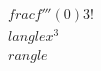 \documentclass[preview]{standalone}
\begin{document}
\begin{align*}
\quad\\frac{f'''(0)}{3!}\quad\\langle x^3 \quad\\rangle
\end{align*}
\end{document}
